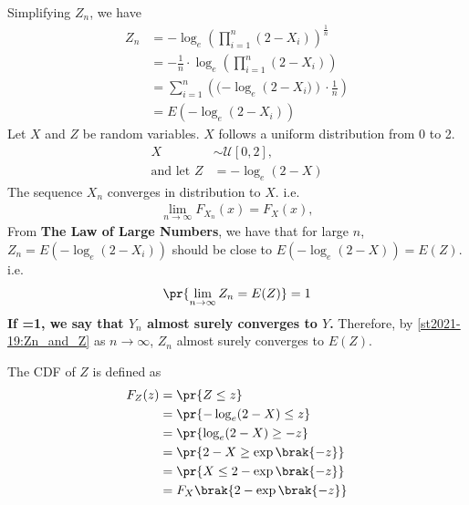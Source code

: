 
Simplifying $Z_n$, we have
\begin{align}
    Z_n &= -\log_e \left( \prod\limits_{i=1}^n (2-X_i) \right)^\frac{1}{n}\\
        &= -\frac{1}{n}\cdot \log_e \left( \prod\limits_{i=1}^n (2-X_i) \right)\\
        &= \sum\limits_{i=1}^n \left( (-\log_e \left( 2-X_i )\right)\cdot\frac{1}{n} \right)\\
        &= E\left(-\log_e \left( 2-X_i \right)\right)
\end{align}
Let $X$ and $Z$ be random variables. $X$ follows a uniform distribution from 0 to 2.
\begin{align}
    X &\sim \mathcal{U}[0,2],\\
    \text{and let }    Z&=-\log_e (2-X)
\end{align}
The sequence $X_n$ converges in distribution to $X$. i.e.
\begin{align}
    \lim _{n\to \infty }F_{X_n}(x)=F_X(x),
\end{align}
From \textbf{The Law of Large Numbers}, we have that %
 for large $n$, $Z_n=E\left(-\log_e \left( 2-X_i \right)\right)$ should be close to $E\left(-\log_e \left( 2-X \right)\right)=E(Z)$. i.e.
\begin{align}
    \pr{\lim\limits_{n \to \infty}Z_n=E(Z)}=1
    \label{st2021-19:Zn_and_Z}
\end{align}
\textbf{If =1, we say that $Y_n$ almost surely converges to $Y$.} Therefore, by \eqref{st2021-19:Zn_and_Z} as $n \to \infty$, $Z_n$ almost surely converges to $E(Z)$.\\
\par The CDF of $Z$ is defined as 
\begin{align}
    F_Z(z) &= \pr{Z \leq z} \\
           &= \pr{ -\log_e(2-X)\leq z} \\
           &= \pr{\log_e(2-X) \geq -z}\\
           &= \pr{2-X \geq \exp\brak{-z}}\\
           &= \pr{X \leq 2- \exp\brak{-z}}\\
           &= F_X\brak{2- \exp\brak{-z}}
\label{st2021-19:CDF_Z}
\end{align}
